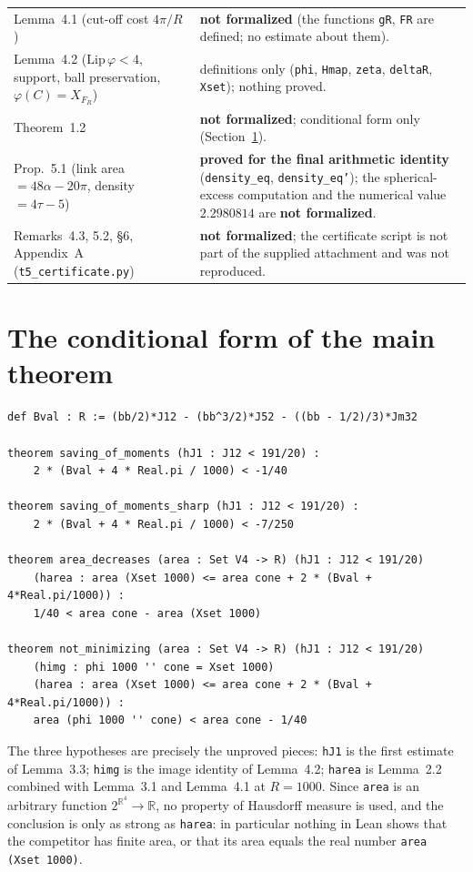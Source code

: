 \documentclass[11pt]{article}
\newcommand{\Ln}[1]{\texttt{#1}}
\begin{document}
\begin{longtable}{L{5.3cm}L{10.4cm}}
Lemma~4.1 (cut-off cost $4\pi/R$) & \textbf{not formalized} (the functions
\Ln{gR}, \Ln{FR} are defined; no estimate about them).\\
Lemma~4.2 ($\mathrm{Lip}\,\varphi<4$, support, ball preservation, $\varphi(C)=X_{F_R}$) &
definitions only (\Ln{phi}, \Ln{Hmap}, \Ln{zeta}, \Ln{deltaR}, \Ln{Xset}); nothing proved.\\
Theorem~1.2 & \textbf{not formalized}; conditional form only (Section~\ref{sec:conditional}).\\
Prop.~5.1 (link area $=48\alpha-20\pi$, density $=4\tau-5$) & \textbf{proved for the final
arithmetic identity} (\Ln{density\_\allowbreak{}eq}, \Ln{density\_\allowbreak{}eq'}); the spherical-excess computation
and the numerical value $2.2980814$ are \textbf{not formalized}.\\
Remarks~4.3, 5.2, \S6, Appendix~A (\Ln{t5\_\allowbreak{}certificate.py}) & \textbf{not formalized}; the
certificate script is not part of the supplied attachment and was not reproduced.\\
\bottomrule
\end{longtable}

\section{The conditional form of the main theorem}
\label{sec:conditional}

\begin{verbatim}
def Bval : R := (bb/2)*J12 - (bb^3/2)*J52 - ((bb - 1/2)/3)*Jm32

theorem saving_of_moments (hJ1 : J12 < 191/20) :
    2 * (Bval + 4 * Real.pi / 1000) < -1/40

theorem saving_of_moments_sharp (hJ1 : J12 < 191/20) :
    2 * (Bval + 4 * Real.pi / 1000) < -7/250

theorem area_decreases (area : Set V4 -> R) (hJ1 : J12 < 191/20)
    (harea : area (Xset 1000) <= area cone + 2 * (Bval + 4*Real.pi/1000)) :
    1/40 < area cone - area (Xset 1000)

theorem not_minimizing (area : Set V4 -> R) (hJ1 : J12 < 191/20)
    (himg : phi 1000 '' cone = Xset 1000)
    (harea : area (Xset 1000) <= area cone + 2 * (Bval + 4*Real.pi/1000)) :
    area (phi 1000 '' cone) < area cone - 1/40
\end{verbatim}

The three hypotheses are precisely the unproved pieces: \Ln{hJ1} is the first estimate of
Lemma~3.3; \Ln{himg} is the image identity of Lemma~4.2; \Ln{harea} is Lemma~2.2 combined with
Lemma~3.1 and Lemma~4.1 at $R=1000$. Since \Ln{area} is an arbitrary function
$2^{\mathbb{R}^4}\to\mathbb{R}$, no property of Hausdorff measure is used, and the conclusion is
only as strong as \Ln{harea}: in particular nothing in Lean shows that the competitor has finite
area, or that its area equals the real number \Ln{area (Xset 1000)}.
\end{document}
